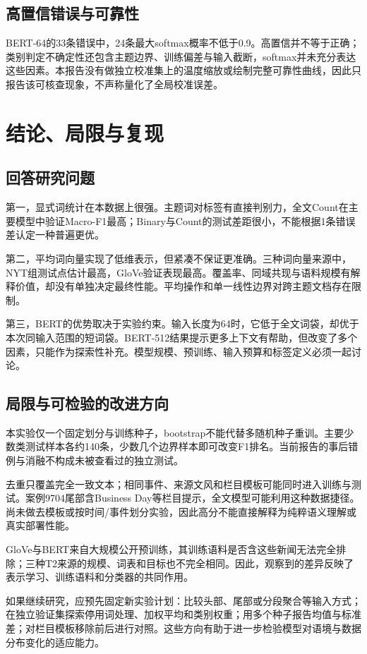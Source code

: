 \documentclass[UTF8,a4paper,11pt,fontset=fandol]{ctexart}
\begin{document}
\subsection{高置信错误与可靠性}
BERT-64的33条错误中，24条最大softmax概率不低于0.9。高置信并不等于正确；类别判定不确定性还包含主题边界、训练偏差与输入截断，softmax并未充分表达这些因素。本报告没有做独立校准集上的温度缩放或绘制完整可靠性曲线，因此只报告该可核查现象，不声称量化了全局校准误差。

\section{结论、局限与复现}
\subsection{回答研究问题}
第一，显式词统计在本数据上很强。主题词对标签有直接判别力，全文Count在主要模型中验证Macro-F1最高；Binary与Count的测试差距很小，不能根据1条错误差认定一种普遍更优。

第二，平均词向量实现了低维表示，但紧凑不保证更准确。三种词向量来源中，NYT组测试点估计最高，GloVe验证表现最高。覆盖率、同域共现与语料规模有解释价值，却没有单独决定最终性能。平均操作和单一线性边界对跨主题文档存在限制。

第三，BERT的优势取决于实验约束。输入长度为64时，它低于全文词袋，却优于本次同输入范围的短词袋。BERT-512结果提示更多上下文有帮助，但改变了多个因素，只能作为探索性补充。模型规模、预训练、输入预算和标签定义必须一起讨论。

\subsection{局限与可检验的改进方向}
本实验仅一个固定划分与训练种子，bootstrap不能代替多随机种子重训。主要少数类测试样本各约140条，少数几个边界样本即可改变F1排名。当前报告的事后错例与消融不构成未被查看过的独立测试。

去重只覆盖完全一致文本；相同事件、来源文风和栏目模板可能同时进入训练与测试。案例9704尾部含Business Day等栏目提示，全文模型可能利用这种数据捷径。尚未做去模板或按时间/\allowbreak{}事件划分实验，因此高分不能直接解释为纯粹语义理解或真实部署性能。

GloVe与BERT来自大规模公开预训练，其训练语料是否含这些新闻无法完全排除；三种T2来源的规模、词表和目标也不完全相同。因此，观察到的差异反映了表示学习、训练语料和分类器的共同作用。

如果继续研究，应预先固定新实验计划：比较头部、尾部或分段聚合等输入方式；在独立验证集探索停用词处理、加权平均和类别权重；用多个种子报告均值与标准差；对栏目模板移除前后进行对照。这些方向有助于进一步检验模型对语境与数据分布变化的适应能力。
\end{document}
